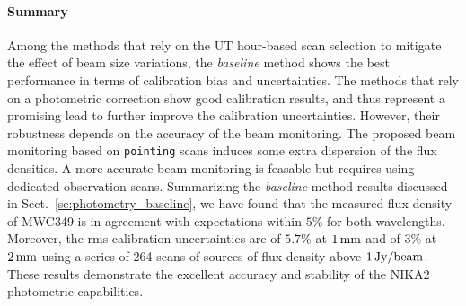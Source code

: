 \paragraph{Summary} Among the methods that rely on the UT hour-based
scan selection to mitigate the effect of beam size variations, the
\emph{baseline} method shows the best performance in terms of calibration
bias and uncertainties. The methods that rely on a photometric correction
show good calibration results, and thus represent a promising lead
to further improve the calibration uncertainties. However, their
robustness depends on the accuracy of the beam monitoring. {\lp The
proposed beam monitoring based on {\tt pointing} scans induces some
extra dispersion of the flux densities. A more accurate beam monitoring is
feasable but requires using dedicated observation scans.} 
Summarizing the \emph{baseline} method results discussed in
Sect.~\ref{se:photometry_baseline}, we have found that the measured
flux density of MWC349 is in agreement with expectations within $5\%$
for both wavelengths. Moreover, the rms calibration
uncertainties are of $5.7\%$ at $1\,\rm{mm}$ and of $3\%$ at $2\,\rm{mm}$
using a series of 264 scans of sources of flux density above
$1\, \rm{Jy}/\rm{beam}$.
These results demonstrate the excellent accuracy and stability of the
NIKA2 photometric capabilities.





